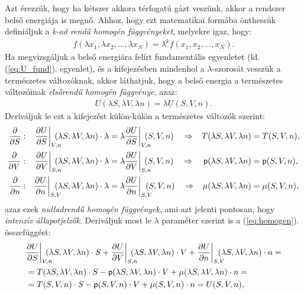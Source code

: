 Azt érezzük, hogy ha kétszer akkora térfogatú gázt veszünk, akkor a rendszer belső energiája is megnő. Ahhoz, hogy ezt matematikai formába önthessük definiáljuk a \emph{k-ad rendű homogén függvényeket}, melyekre igaz, hogy:
\begin{align}
	f(\lambda x_1,\lambda x_2,\dots,\lambda x_N) = \lambda^k f(x_1,x_2,\dots,x_N).
\end{align}
Ha megvizsgáljuk a belső energiára felírt fundamentális egyenletet (ld. (\ref{eq:U_fund}). egyenlet), és a kifejezésben mindenhol a $\lambda$-szorosát vesszük a természetes változóknak, akkor láthatjuk, hogy a belső energia a természetes változóinak \emph{elsőrendű homogén függvénye}, azaz:
\begin{align}\label{eq:homogen}
	U(\lambda S,\lambda V, \lambda n) = \lambda U(S,V,n).
\end{align}
Deriváljuk le ezt a kifejezést külön-külön a természetes változók szerint:
\begin{align}
	\pd{}{S}&: &\pd US\bigg|_{V,n}\hspace{-3mm}(\lambda S,\lambda V, \lambda n)\cdot \lambda &= \lambda \pd US\bigg|_{V,n}\hspace{-3mm} (S,V,n)\quad \Rightarrow &T(\lambda S,\lambda V, \lambda n) &= T(S,V,n),\\
	\pd{}{V}&: &\pd UV\bigg|_{S,n}\hspace{-3mm}(\lambda S,\lambda V, \lambda n)\cdot \lambda &= \lambda \pd UV\bigg|_{S,n}\hspace{-3mm} (S,V,n)\quad \Rightarrow &\pres(\lambda S,\lambda V, \lambda n) &= \pres(S,V,n),\\
	\pd{}{n}&: &\pd Un\bigg|_{S,V}\hspace{-3mm}(\lambda S,\lambda V, \lambda n)\cdot \lambda &= \lambda \pd Un\bigg|_{S,V}\hspace{-3mm} (S,V,n)\quad \Rightarrow &\mu(\lambda S,\lambda V, \lambda n) &= \mu(S,V,n),
\end{align}
azaz ezek \emph{nulladrendű homogén függvények}, ami azt jelenti pontosan, hogy \emph{intenzív állapotjelzők}.
Deriváljuk most le $\lambda$ paraméter szerint is a (\ref{eq:homogen}). összefüggést:
\begin{align}
\begin{split}
	&\pd US\bigg|_{V,n}\hspace{-3mm}(\lambda S,\lambda V, \lambda n)\cdot S + \pd UV\bigg|_{S,n}\hspace{-3mm}(\lambda S,\lambda V, \lambda n)\cdot V+\pd Un\bigg|_{S,V}\hspace{-3mm}(\lambda S,\lambda V, \lambda n)\cdot n =\\
	&= T(\lambda S,\lambda V, \lambda n)\cdot S-\pres(\lambda S,\lambda V, \lambda n)\cdot V +\mu(\lambda S,\lambda V, \lambda n)\cdot n =\\
	&= T(S,V,n)\cdot S - \pres(S,V,n)\cdot V + \mu(S,V,n)\cdot n = U(S,V,n),
\end{split}
\end{align}
